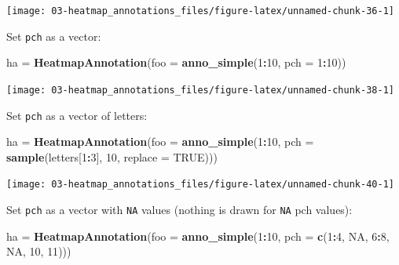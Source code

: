 \documentclass[]{book}
\newenvironment{Shaded}{\begin{snugshade}}{\end{snugshade}}
\newcommand{\KeywordTok}[1]{\textcolor[rgb]{0.13,0.29,0.53}{\textbf{#1}}}
\newcommand{\DataTypeTok}[1]{\textcolor[rgb]{0.13,0.29,0.53}{#1}}
\newcommand{\DecValTok}[1]{\textcolor[rgb]{0.00,0.00,0.81}{#1}}
\newcommand{\StringTok}[1]{\textcolor[rgb]{0.31,0.60,0.02}{#1}}
\newcommand{\OtherTok}[1]{\textcolor[rgb]{0.56,0.35,0.01}{#1}}
\newcommand{\OperatorTok}[1]{\textcolor[rgb]{0.81,0.36,0.00}{\textbf{#1}}}
\newcommand{\NormalTok}[1]{#1}
\theoremstyle{definition}
\theoremstyle{definition}
\theoremstyle{definition}
\theoremstyle{remark}
\begin{document}
\begin{center}\texttt{[image: 03-heatmap\_annotations\_files/figure-latex/unnamed-chunk-36-1]} \end{center}

Set \texttt{pch} as a vector:

\begin{Shaded}
\begin{Highlighting}[]
\NormalTok{ha =}\StringTok{ }\KeywordTok{HeatmapAnnotation}\NormalTok{(}\DataTypeTok{foo =} \KeywordTok{anno_simple}\NormalTok{(}\DecValTok{1}\OperatorTok{:}\DecValTok{10}\NormalTok{, }\DataTypeTok{pch =} \DecValTok{1}\OperatorTok{:}\DecValTok{10}\NormalTok{))}
\end{Highlighting}
\end{Shaded}

\begin{center}\texttt{[image: 03-heatmap\_annotations\_files/figure-latex/unnamed-chunk-38-1]} \end{center}

Set \texttt{pch} as a vector of letters:

\begin{Shaded}
\begin{Highlighting}[]
\NormalTok{ha =}\StringTok{ }\KeywordTok{HeatmapAnnotation}\NormalTok{(}\DataTypeTok{foo =} \KeywordTok{anno_simple}\NormalTok{(}\DecValTok{1}\OperatorTok{:}\DecValTok{10}\NormalTok{, }
    \DataTypeTok{pch =} \KeywordTok{sample}\NormalTok{(letters[}\DecValTok{1}\OperatorTok{:}\DecValTok{3}\NormalTok{], }\DecValTok{10}\NormalTok{, }\DataTypeTok{replace =} \OtherTok{TRUE}\NormalTok{)))}
\end{Highlighting}
\end{Shaded}

\begin{center}\texttt{[image: 03-heatmap\_annotations\_files/figure-latex/unnamed-chunk-40-1]} \end{center}

Set \texttt{pch} as a vector with \texttt{NA} values (nothing is drawn
for \texttt{NA} pch values):

\begin{Shaded}
\begin{Highlighting}[]
\NormalTok{ha =}\StringTok{ }\KeywordTok{HeatmapAnnotation}\NormalTok{(}\DataTypeTok{foo =} \KeywordTok{anno_simple}\NormalTok{(}\DecValTok{1}\OperatorTok{:}\DecValTok{10}\NormalTok{, }\DataTypeTok{pch =} \KeywordTok{c}\NormalTok{(}\DecValTok{1}\OperatorTok{:}\DecValTok{4}\NormalTok{, }\OtherTok{NA}\NormalTok{, }\DecValTok{6}\OperatorTok{:}\DecValTok{8}\NormalTok{, }\OtherTok{NA}\NormalTok{, }\DecValTok{10}\NormalTok{, }\DecValTok{11}\NormalTok{)))}
\end{Highlighting}
\end{Shaded}
\end{document}
